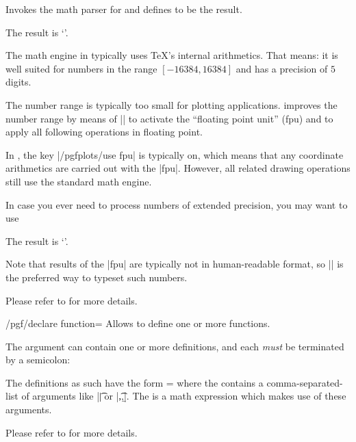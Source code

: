 \begin{command}{\pgfmathparse{}}
    Invokes the \pgfname{} math parser for  and defines
    \declareandlabel{\pgfmathresult} to be the result.
\begin{codeexample}[]

The result is `\pgfmathresult'.
\end{codeexample}
    \noindent The math engine in \pgfname{} typically uses \TeX's internal
    arithmetics. That means: it is well suited for numbers in the range
    $[-16384,16384]$ and has a precision of $5$ digits.

    The number range is typically too small for plotting applications.
    \PGFPlots{} improves the number range by means of
    || to activate the ``floating point
    unit'' (fpu) and to apply all following operations in floating point.

    In \PGFPlots{}, the key |/pgfplots/use fpu| is typically on, which means
    that any coordinate arithmetics are carried out with the |fpu|. However,
    all \pgfname{} related drawing operations still use the standard math
    engine.

    In case you ever need to process numbers of extended precision, you may
    want to use
\begin{codeexample}[]
%

The result is `\pgfmathprintnumber{\pgfmathresult}'.
\end{codeexample}
    Note that results of the |fpu| are typically not in human-readable format,
    so |\pgfmathprintnumber| is the preferred way to typeset such numbers.

    Please refer to \cite{tikz} for more details.
\end{command}

\begin{key}{/pgf/declare function=}
    Allows to define one or more functions.

    The argument  can contain one or more
    definitions, and each \emph{must} be terminated by a semicolon:
\begin{codeexample}[]
\end{codeexample}
    The definitions as such have the form  =
     where the  contains a
    comma-separated-list of arguments like |\t| or |\t,\a,\b|. The
     is a math expression which makes use of these arguments.

    Please refer to \cite{tikz} for more details.
\end{key}

